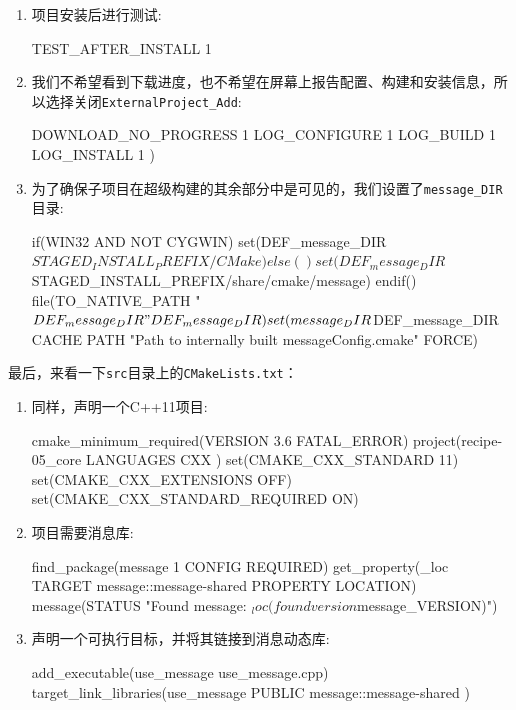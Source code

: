 \begin{enumerate}
\item 项目安装后进行测试:

\begin{codebox}[cmake]
    TEST_AFTER_INSTALL
        1
\end{codebox}

\item 我们不希望看到下载进度，也不希望在屏幕上报告配置、构建和安装信息，所以选择关闭\texttt{ExternalProject\_Add}:

\begin{codebox}[cmake]
  DOWNLOAD_NO_PROGRESS
    1
  LOG_CONFIGURE
    1
  LOG_BUILD
    1
  LOG_INSTALL
    1
)
\end{codebox}

\item 为了确保子项目在超级构建的其余部分中是可见的，我们设置了\texttt{message\_DIR}目录:

\begin{codebox}[cmake]
if(WIN32 AND NOT CYGWIN)
    set(DEF_message_DIR ${STAGED_INSTALL_PREFIX}/CMake)
else()
    set(DEF_message_DIR ${STAGED_INSTALL_PREFIX}/share/cmake/message)
endif()
file(TO_NATIVE_PATH "${DEF_message_DIR}" DEF_message_DIR)
set(message_DIR ${DEF_message_DIR}
CACHE PATH "Path to internally built messageConfig.cmake" FORCE)
\end{codebox}

\end{enumerate}

最后，来看一下\texttt{src}目录上的\texttt{CMakeLists.txt}：

\begin{enumerate}
\item 同样，声明一个C++11项目:

\begin{codebox}[cmake]
cmake_minimum_required(VERSION 3.6 FATAL_ERROR)
project(recipe-05_core
LANGUAGES CXX
)
set(CMAKE_CXX_STANDARD 11)
set(CMAKE_CXX_EXTENSIONS OFF)
set(CMAKE_CXX_STANDARD_REQUIRED ON)
\end{codebox}

\item 项目需要消息库:

\begin{codebox}[cmake]
find_package(message 1 CONFIG REQUIRED)
get_property(_loc TARGET message::message-shared PROPERTY LOCATION)
message(STATUS "Found message: ${_loc} (found version ${message_VERSION})")
\end{codebox}

\item 声明一个可执行目标，并将其链接到消息动态库:

\begin{codebox}[cmake]
add_executable(use_message use_message.cpp)
target_link_libraries(use_message
  PUBLIC
    message::message-shared
  )
\end{codebox}

\end{enumerate}

